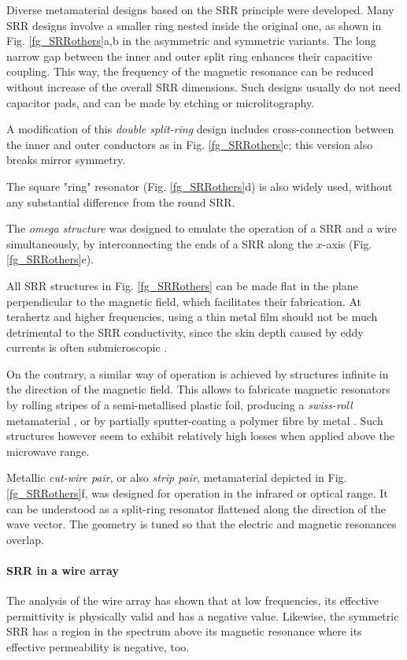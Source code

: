 Diverse metamaterial designs based on the SRR principle were developed.
Many SRR designs involve a smaller ring nested inside the original one, as shown in Fig. \ref{fg_SRRothers}a,b in the asymmetric and symmetric variants. The long narrow gap between the inner and outer split ring enhances their capacitive coupling. This way, the frequency of the magnetic resonance can be reduced without increase of the overall SRR dimensions. Such designs usually do not need capacitor pads, and can be made by etching or microlitography. 

A modification of this \textit{double split-ring} design includes cross-connection between the inner and outer conductors as in Fig. \ref{fg_SRRothers}c; this version also breaks mirror symmetry. 

The square "ring" resonator (Fig. \ref{fg_SRRothers}d) is also widely used, without any substantial difference from the round SRR.

The \textit{omega structure} was designed to emulate the operation of a SRR and a wire simultaneously, by interconnecting the ends of a SRR along the $x$-axis (Fig. \ref{fg_SRRothers}e).

All SRR structures in Fig. \ref{fg_SRRothers} can be made flat in the plane perpendicular to the magnetic field, which facilitates their fabrication. At terahertz and higher frequencies, using a thin metal film should not be much detrimental to the SRR conductivity, since the skin depth caused by eddy currents is often submicroscopic \cite{gibbons2010scalable}.

On the contrary, a similar way of operation is achieved by structures infinite in the direction of the magnetic field. This allows to fabricate magnetic resonators by rolling stripes of a semi-metallised plastic foil, producing a \textit{swiss-roll} metamaterial \cite{gibbons2010scalable}, or by partially sputter-coating a polymer fibre by metal \cite{wang2011fiber}. Such structures however seem to exhibit relatively high losses when applied above the microwave range.

Metallic \textit{cut-wire pair}, or also \textit{strip pair}, metamaterial depicted in Fig. \ref{fg_SRRothers}f, was designed for operation in the infrared or optical range. It can be understood as a split-ring resonator flattened along the direction of the wave vector. The geometry is tuned so that the electric and magnetic resonances overlap.	

\paragraph{SRR in a wire array} %
The analysis of the wire array has shown that at low frequencies, its effective permittivity is physically valid and has a negative value. Likewise, the symmetric SRR has a region in the spectrum above its magnetic resonance where its effective permeability is negative, too.

